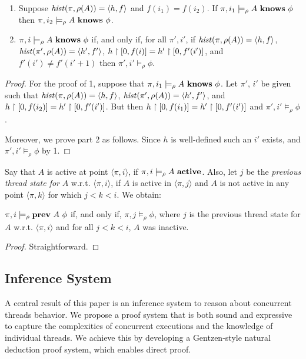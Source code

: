 \begin{proposition}
\mbox{}
\begin{enumerate}
\item Suppose $\mathit{hist}(\pi,\rho(A))=\langle h,f\rangle$ and $f(i_1) = f(i_2)$. If
$\pi,i_1\models_\rho A\ \Knows\ \phi$ then $\pi,i_2\models_\rho A\ \Knows\ \phi$.
\item $\pi,i\models_\rho A\ \Knows\ \phi$ if, and only if, for all $\pi',i'$, if $\mathit{hist}(\pi,\rho(A))=\langle h,f\rangle$,
$\mathit{hist}(\pi',\rho(A))=\langle h',f'\rangle$, $ h\upharpoonright [0,f(i)] = h'\upharpoonright [0,f'(i')]$, and $f'(i')\neq f'(i'+1)$ then $\pi',i' \models_\rho \phi$.
\end{enumerate}
\end{proposition}
\begin{proof}
For the proof of 1, suppose that $\pi,i_1\models_\rho A\ \Knows\ \phi$. Let $\pi'$, $i'$ be given such that 
$\mathit{hist}(\pi,\rho(A))=\langle h,f\rangle$, $\mathit{hist}(\pi',\rho(A))=\langle h',f'\rangle$, and $ h\upharpoonright [0,f(i_2)] = h'\upharpoonright [0,f'(i')]$.
But then $h\upharpoonright [0,f(i_1)] = h'\upharpoonright [0,f'(i')]$ and $\pi',i'\models_\rho \phi$.

Moreover, we prove part 2 as follows. Since $h$ is well-defined such an $i'$ exists, and $\pi',i' \models_\rho \phi$ by 1.
\end{proof}

Say that $A$ is active at point $\langle \pi,i\rangle$, if $\pi,i\models_\rho A\ \mathbf{active}$. Also, let
$j$ be the \emph{previous thread state for} $A$ w.r.t. $\langle \pi,i\rangle$, if
$A$ is active in $\langle\pi,j\rangle$ and $A$ is not active in any point $\langle \pi,k \rangle$ for
which $j < k < i$. We obtain:

\begin{proposition}
\label{160329.1}
$\pi,i\models_\rho \mathbf{prev}\ A\ \phi$ if, and only if, $\pi,j \models_\rho \phi$, where $j$ is the previous thread state
for $A$ w.r.t. $\langle\pi,i\rangle$ and for all $j<k<i$, $A$ was inactive.
\end{proposition}
\begin{proof}
Straightforward.
\end{proof}

 
\subsection{Inference System}
\label{sec:ProofSystem}
%
A central result of this paper is an inference system to reason about concurrent threads behavior. 
We propose a proof system that is both sound and expressive to capture the complexities of concurrent executions and the knowledge of individual threads. 
We achieve this by developing a Gentzen-style natural deduction proof system, which enables direct proof.

